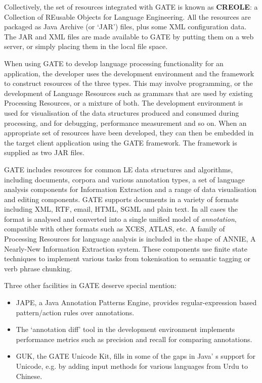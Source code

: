 Collectively, the set of resources integrated with GATE is known as
{\bf CREOLE}: a
Collection of REusable Objects for Language Engineering. All the resources are
packaged as Java Archive (or `JAR') files, plus some XML configuration data.
The JAR and XML files are made available to GATE by putting them on a web
server, or simply placing them in the local file space.

When using GATE to develop language processing functionality for an application,
the developer uses the development environment and the framework to construct
resources of the three types. This may involve programming, or the development
of Language Resources such as grammars that are used by existing Processing
Resources, or a mixture of both. The development environment is used for
visualisation of the data structures produced and consumed during processing,
and for debugging, performance measurement and so on.
When an appropriate set of resources have been developed, they can then be
embedded in the target client application using the GATE framework. The 
framework is supplied as two JAR files.

GATE includes resources for common LE data structures and algorithms,
including documents, corpora and various annotation types, a set of
language analysis components for Information Extraction and a range of data
visualisation and editing components.
GATE supports documents in a variety of formats including XML, RTF, email,
HTML, SGML and plain text. In all cases the format is analysed and converted
into a single unified model of {\em annotation}, compatible with other
formats such as XCES, ATLAS, etc.
A family of Processing Resources for language analysis is included in the
shape of ANNIE, A Nearly-New Information Extraction system. These components
use finite state techniques to implement various tasks from tokenisation to
semantic tagging or verb phrase chunking.

Three other facilities in GATE deserve special mention:
%
\begin{itemize}
%
\item
JAPE, a Java Annotation Patterns Engine, provides regular-expression based
pattern/action rules over annotations.
%
\item
The `annotation diff' tool in the development environment implements
performance metrics such as precision and recall for comparing annotations.
%
\item
GUK, the GATE Unicode Kit, fills in some of the gaps in Java'
s support for Unicode, e.g. by adding input methods for various languages
from Urdu to Chinese.
\end{itemize}
%


